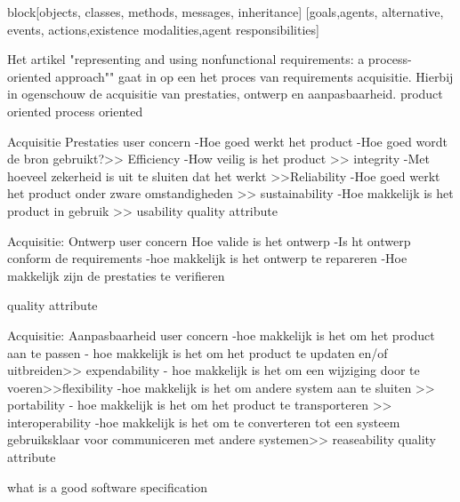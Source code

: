 block[objects, classes, methods, messages, inheritance]
[goals,agents, alternative, events, actions,existence modalities,agent responsibilities]


Het artikel "representing and using nonfunctional requirements: a process-oriented approach"" gaat in op een het proces van requirements acquisitie. Hierbij in ogenschouw de acquisitie van prestaties, ontwerp en aanpasbaarheid.
product oriented
process oriented


Acquisitie Prestaties
user concern
-Hoe goed werkt het product
-Hoe goed wordt de bron gebruikt?>> Efficiency
-How veilig is het product >> integrity
-Met hoeveel zekerheid is uit  te sluiten dat het werkt >>Reliability
-Hoe goed werkt het product onder zware omstandigheden >> sustainability
-Hoe makkelijk is het product in gebruik >> usability
quality attribute


Acquisitie: Ontwerp
user concern
Hoe valide is het ontwerp
-Is ht ontwerp conform de requirements
-hoe makkelijk is het ontwerp te repareren
-Hoe makkelijk zijn de prestaties te verifieren

quality attribute


Acquisitie: Aanpasbaarheid
user concern
-hoe makkelijk is het om het product aan te passen
- hoe makkelijk is het om het product te updaten en/of uitbreiden>> expendability
- hoe makkelijk is het om een wijziging door te voeren>>flexibility
-hoe makkelijk is het om andere system aan te sluiten >> portability
- hoe makkelijk is het om het product te transporteren >> interoperability
-hoe makkelijk is het om te converteren tot een systeem gebruiksklaar voor communiceren met andere systemen>> reaseability
quality attribute




 \cite{jonkerTreurKlush200informativeAgents}
\cite{boehmBoseLeeRequirementsNegotiations}
\cite{muHungJinLiu2013inconsistencyReqs}
\cite{hunterNuseibeh1996manageSpecs}
\cite{myloloupos1992representingReqs}
\cite{zavePamela4darkCorners}
\cite{zavePAmela1997regEngineering}


what is a good software specification

\cite{fvaandrager2322010Goodmodel}
\cite{onix01102022devopmodel}
\cite{sulemani04012021softwareprocesmodel}
\cite{globalluxsoft18102017softdev}
\cite{wiegers30052022SRS}
\cite{muller06092020goodspecification}
\cite{informit30062008reqmanagement}
\cite{altexsoft15092020writingSRS}


